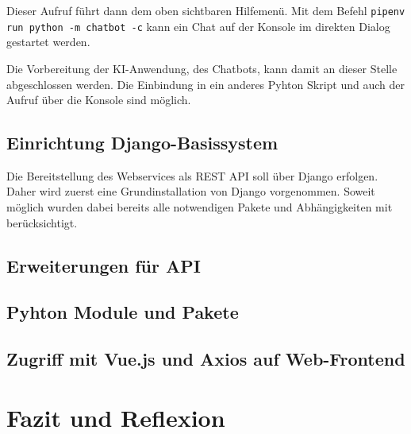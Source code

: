 \documentclass[12pt,oneside,titlepage,listof=totoc,bibliography=totoc]{scrartcl}
\newcommand{\code}[1]{\colorbox{code-gray}{\texttt{#1}}}
\begin{document}
Dieser Aufruf führt dann dem oben sichtbaren Hilfemenü. Mit dem Befehl \code{pipenv run python -m chatbot -c} kann ein Chat auf der Konsole im direkten Dialog gestartet werden. 

Die Vorbereitung der KI-Anwendung, des Chatbots, kann damit an dieser Stelle abgeschlossen werden. Die Einbindung in ein anderes Pyhton Skript und auch der Aufruf über die Konsole sind möglich.
	


\subsection{Einrichtung Django-Basissystem }

Die Bereitstellung des Webservices als REST API soll über Django erfolgen. Daher wird zuerst eine Grundinstallation von Django vorgenommen. Soweit möglich wurden dabei bereits alle notwendigen Pakete und Abhängigkeiten mit berücksichtigt.



\subsection{Erweiterungen für API}
 
\subsection{Pyhton Module und Pakete}
\subsection{Zugriff mit Vue.js und Axios auf Web-Frontend}

\section{Fazit und Reﬂexion}
\end{document}

